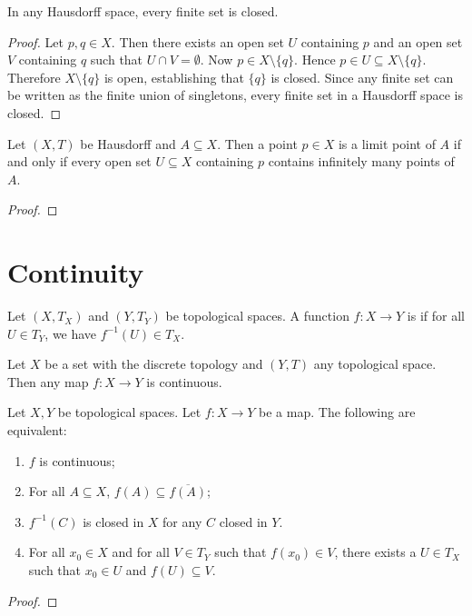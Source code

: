 \begin{proposition}
    In any Hausdorff space, every finite set is closed.
\end{proposition}
    \begin{proof}
        Let $p,q \in X$. Then there exists an open set $U$ containing $p$ and an open set $V$ containing $q$ such that $U \cap V = \emptyset$. Now $p \in X \setminus \{q\}$. Hence $p \in U \subseteq X \setminus \{q\}$. Therefore $X \setminus\{q\}$ is open, establishing that $\{q\}$ is closed. Since any finite set can be written as the finite union of singletons, every finite set in a Hausdorff space is closed.
    \end{proof}

\begin{proposition}
    Let $(X,T)$ be Hausdorff and $A \subseteq X$. Then a point $p \in X$ is a limit point of $A$ if and only if every open set $U \subseteq X$ containing $p$ contains infinitely many points of $A$.
\end{proposition}
    {\color{red} \begin{proof}

    \end{proof}}

\section{Continuity}

\begin{definition}
    Let $(X,T_X)$ and $(Y,T_Y)$ be topological spaces. A function $f:X \rightarrow Y$ is  if for all $U \in T_Y$, we have $f^{-1}(U) \in T_X$.
\end{definition}

\begin{example}
    Let $X$ be a set with the discrete topology and $(Y,T)$ any topological space. Then any map $f:X \rightarrow Y$ is continuous.
\end{example}

\begin{proposition}
    Let $X,Y$ be topological spaces. Let $f:X \rightarrow Y$ be a map. The following are equivalent:
        \begin{enumerate}[label = (\arabic*),itemsep=1pt,topsep=3pt]
            \item $f$ is continuous;
            \item For all $A \subseteq X$, $f(A) \subseteq \overline{f(A)}$;
            \item $f^{-1}(C)$ is closed in $X$ for any $C$ closed in $Y$.
            \item For all $x_0 \in X$ and for all $V \in T_Y$ such that $f(x_0) \in V$, there exists a $U \in T_X$ such that $x_0 \in U$ and $f(U) \subseteq V$.
        \end{enumerate}
\end{proposition}
    {\color{red} \begin{proof}
        
    \end{proof}}

